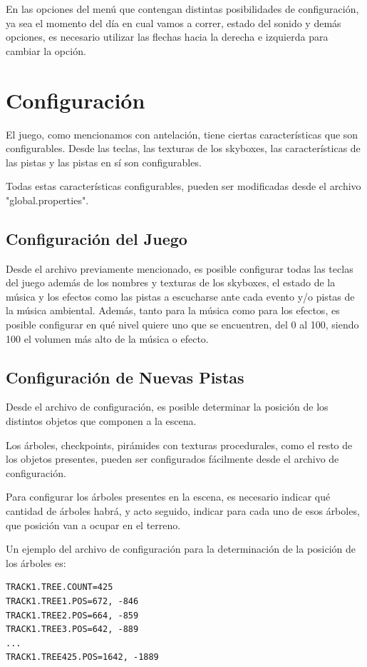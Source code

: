 \documentclass[a4paper,10pt]{article}
\begin{document}
En las opciones del menú que contengan distintas posibilidades de
configuración, ya sea el momento del día en cual vamos a correr, estado del
sonido y demás opciones, es necesario utilizar las flechas hacia la derecha e
izquierda para cambiar la opción.
\section{Configuración}
\label{configuracion}
El juego, como mencionamos con antelación, tiene ciertas características que
son configurables.  Desde las teclas, las texturas de los skyboxes, las
características de las pistas y las pistas en sí son configurables.

Todas estas características configurables, pueden ser modificadas desde el
archivo "global.properties".

\subsection{Configuración del Juego}

Desde el archivo previamente mencionado, es posible configurar todas las teclas
del juego además de los nombres y texturas de los skyboxes, el estado de la
música y los efectos como las pistas a escucharse ante cada evento y/o pistas
de la música ambiental.  Además, tanto para la música como para los efectos, es
posible configurar en qué nivel quiere uno que se encuentren, del 0 al 100,
siendo 100 el volumen más alto de la música o efecto.

\subsection{Configuración de Nuevas Pistas}

Desde el archivo de configuración, es posible determinar la posición de los
distintos objetos que componen a la escena.

Los árboles, checkpoints, pirámides con texturas procedurales, como el resto de
los objetos presentes, pueden ser configurados fácilmente desde el archivo de
configuración.

Para configurar los árboles presentes en la escena, es necesario indicar qué
cantidad de árboles habrá, y acto seguido, indicar para cada uno de esos
árboles, que posición van a ocupar en el terreno.

Un ejemplo del archivo de configuración para la determinación de la posición de
los árboles es:

\begin{verbatim}
TRACK1.TREE.COUNT=425
TRACK1.TREE1.POS=672, -846
TRACK1.TREE2.POS=664, -859
TRACK1.TREE3.POS=642, -889
...
TRACK1.TREE425.POS=1642, -1889
\end{verbatim}
\end{document}
